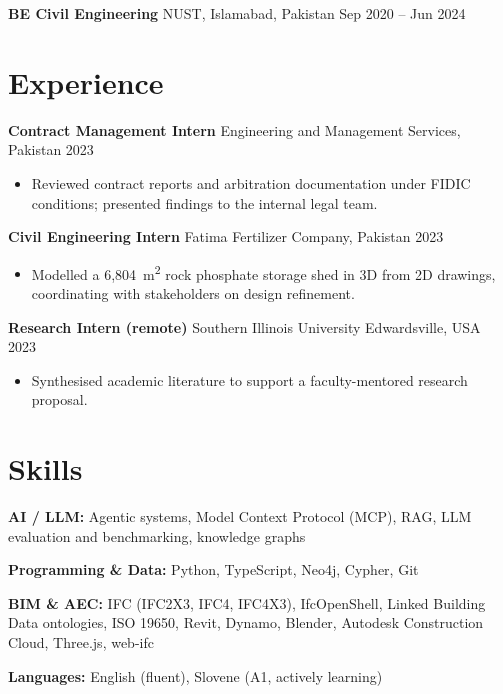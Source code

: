 \documentclass[a4paper,10.5pt]{article}
\newcommand{\datefill}{\dotfill}
\newcommand{\entry}[3]{\vspace{2.5pt}\noindent\textbf{#1} \textbar{} #2 \datefill{} #3\par\vspace{0.5pt}}
\newcommand{\skillrow}[2]{\noindent\textbf{#1:} #2\par\vspace{1pt}}
\begin{document}
\entry{BE Civil Engineering}{NUST, Islamabad, Pakistan}{Sep 2020 -- Jun 2024}

\section{Experience}
\entry{Contract Management Intern}{Engineering and Management Services, Pakistan}{2023}
\begin{itemize}
  \item Reviewed contract reports and arbitration documentation under FIDIC
        conditions; presented findings to the internal legal team.
\end{itemize}

\entry{Civil Engineering Intern}{Fatima Fertilizer Company, Pakistan}{2023}
\begin{itemize}
  \item Modelled a 6,804~m\textsuperscript{2} rock phosphate storage shed in 3D from
        2D drawings, coordinating with stakeholders on design refinement.
\end{itemize}

\entry{Research Intern (remote)}{Southern Illinois University Edwardsville, USA}{2023}
\begin{itemize}
  \item Synthesised academic literature to support a faculty-mentored research proposal.
\end{itemize}

\section{Skills}

\skillrow{AI / LLM}{Agentic systems, Model Context Protocol (MCP), RAG, LLM evaluation and benchmarking, knowledge graphs}
\skillrow{Programming \& Data}{Python, TypeScript, Neo4j, Cypher, Git}
\skillrow{BIM \& AEC}{IFC (IFC2X3, IFC4, IFC4X3), IfcOpenShell, Linked Building Data ontologies, ISO 19650, Revit, Dynamo, Blender, Autodesk Construction Cloud, Three.js, web-ifc}

\skillrow{Languages}{English (fluent), Slovene (A1, actively learning)}
\end{document}
